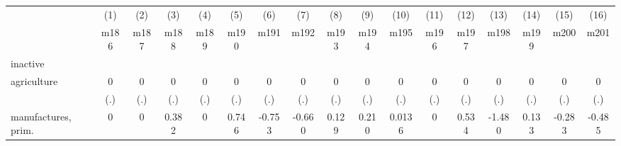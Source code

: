 {
\def\sym#1{\ifmmode^{#1}\else\(^{#1}\)\fi}
\begin{tabular}{l*{16}{c}}
\hline\hline
                    &\multicolumn{1}{c}{(1)}&\multicolumn{1}{c}{(2)}&\multicolumn{1}{c}{(3)}&\multicolumn{1}{c}{(4)}&\multicolumn{1}{c}{(5)}&\multicolumn{1}{c}{(6)}&\multicolumn{1}{c}{(7)}&\multicolumn{1}{c}{(8)}&\multicolumn{1}{c}{(9)}&\multicolumn{1}{c}{(10)}&\multicolumn{1}{c}{(11)}&\multicolumn{1}{c}{(12)}&\multicolumn{1}{c}{(13)}&\multicolumn{1}{c}{(14)}&\multicolumn{1}{c}{(15)}&\multicolumn{1}{c}{(16)}\\
                    &\multicolumn{1}{c}{m186}&\multicolumn{1}{c}{m187}&\multicolumn{1}{c}{m188}&\multicolumn{1}{c}{m189}&\multicolumn{1}{c}{m190}&\multicolumn{1}{c}{m191}&\multicolumn{1}{c}{m192}&\multicolumn{1}{c}{m193}&\multicolumn{1}{c}{m194}&\multicolumn{1}{c}{m195}&\multicolumn{1}{c}{m196}&\multicolumn{1}{c}{m197}&\multicolumn{1}{c}{m198}&\multicolumn{1}{c}{m199}&\multicolumn{1}{c}{m200}&\multicolumn{1}{c}{m201}\\
\hline
inactive            &                     &                     &                     &                     &                     &                     &                     &                     &                     &                     &                     &                     &                     &                     &                     &                     \\
agriculture         &           0         &           0         &           0         &           0         &           0         &           0         &           0         &           0         &           0         &           0         &           0         &           0         &           0         &           0         &           0         &           0         \\
                    &         (.)         &         (.)         &         (.)         &         (.)         &         (.)         &         (.)         &         (.)         &         (.)         &         (.)         &         (.)         &         (.)         &         (.)         &         (.)         &         (.)         &         (.)         &         (.)         \\
[1em]
manufactures, prim. &           0         &           0         &       0.382         &           0         &       0.746         &      -0.753         &      -0.660         &       0.129         &       0.210         &      0.0136         &           0         &       0.534         &      -1.480         &       0.133         &      -0.283         &      -0.485         \\

\end{tabular}}
